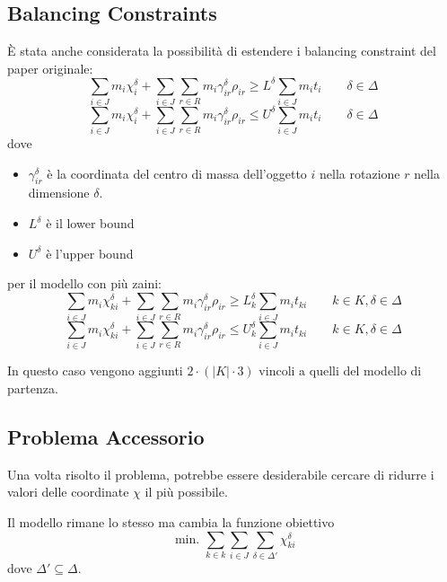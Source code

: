 \documentclass{scrartcl}
\begin{document}
\subsection{Balancing Constraints}
\label{sec:Balancing:Constraint}
È stata anche considerata la possibilità di estendere i balancing constraint del paper originale:
\begin{equation}
\sum_{i \in J} m_i \chi_{i}^\delta + \sum_{i \in J}\sum_{r \in R} m_i \gamma_{ir}^\delta \rho_{ir} \geq L^\delta \sum_{i \in J} m_i t_i \quad\quad \delta \in \Delta
\end{equation}
\begin{equation}
\sum_{i \in J} m_i \chi_{i}^\delta + \sum_{i \in J}\sum_{r \in R} m_i \gamma_{ir}^\delta \rho_{ir} \leq U^\delta \sum_{i \in J} m_i t_i \quad\quad \delta \in \Delta
\end{equation}
dove 
\begin{itemize}
	\item $\gamma_{ir}^\delta$ è la coordinata del centro di massa dell'oggetto $i$ nella rotazione $r$ nella dimensione $\delta$.
	\item $L^\delta$ è il lower bound 
	\item $U^\delta$ è l'upper bound
\end{itemize}

per il modello con più zaini:
\begin{equation}
\sum_{i \in J} m_i \chi_{ki}^\delta + \sum_{i \in J}\sum_{r \in R} m_i \gamma_{ir}^\delta \rho_{ir} \geq L_k^\delta \sum_{i \in J} m_i t_{ki} \quad\quad k \in K, \delta \in \Delta
\end{equation}
\begin{equation}
\sum_{i \in J} m_i \chi_{ki}^\delta + \sum_{i \in J}\sum_{r \in R} m_i \gamma_{ir}^\delta \rho_{ir} \leq U_k^\delta \sum_{i \in J} m_i t_{ki} \quad\quad k \in K, \delta \in \Delta
\end{equation}

In questo caso vengono aggiunti $2 \cdot (|K| \cdot 3)$ vincoli a quelli del modello di partenza.

\subsection{Problema Accessorio}
\label{sec:orig:problemaAcessorio}
Una volta risolto il problema, potrebbe essere desiderabile cercare di ridurre i valori delle coordinate
$\chi$ il più possibile.

Il modello rimane lo stesso ma cambia la funzione obiettivo
\begin{equation}
\text{ min. } \sum_{k\in k}\sum_{i \in J}\sum_{\delta \in \Delta'} \chi_{ki}^\delta
\end{equation}
dove $\Delta' \subseteq \Delta$.
\end{document}
